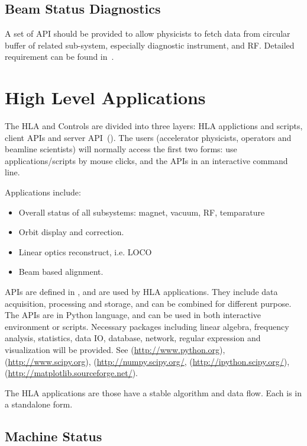 \documentclass[11pt,oneside,letterpaper,showtrims,article]{memoir}
\begin{document}
\section{Beam Status Diagnostics}

A set of API should be provided to allow physicists to fetch data from
circular buffer of related sub-system, especially diagnostic
instrument, and RF. Detailed requirement can be found in~\cite{shen_cbd}.



\chapter{High Level Applications\label{chap:apps}}

The HLA and Controls are divided into three layers: HLA applictions and
scripts, client APIs and server API~(\cite{shen_hla_apis}).  The users
(accelerator physicists, operators and beamline scientists) will normally
access the first two forms: use applications/scripts by mouse clicks, and
the APIs in an interactive command line.


Applications include:
\begin{itemize}
\item Overall status of all subsystems: magnet, vacuum, RF, temparature
\item Orbit display and correction.
\item Linear optics reconstruct, i.e. LOCO
\item Beam based alignment.
\end{itemize}

APIs are defined in \cite{shen_hla_apis}, and are used by HLA
applications. They include data acquisition, processing and storage, and
can be combined for different purpose. The APIs are in Python language,
and can be used in both interactive environment or scripts. Necessary
packages including linear algebra, frequency analysis, statistics, data
IO, database, network, regular expression and visualization will be
provided. See \cite{python} (\url{http://www.python.org}), \cite{scipy}
(\url{http://www.scipy.org}), \cite{numpy}
(\url{http://numpy.scipy.org/}, \cite{ipython}
(\url{http://ipython.scipy.org/}), \cite{matplotlib}
(\url{http://matplotlib.sourceforge.net/}).


The HLA applications are those have a stable algorithm and data
flow. Each is in a standalone form.


\section{Machine Status}
\end{document}
